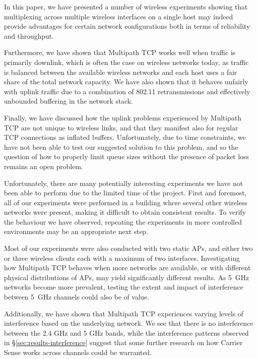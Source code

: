 In this paper, we have presented a number of wireless experiments showing that
multiplexing across multiple wireless interfaces on a single host may indeed
provide advantages for certain network configurations both in terms of
reliability and throughput.

Furthermore, we have shown that Multipath TCP works well when traffic is
primarily downlink, which is often the case on wireless networks today, as
traffic is balanced between the available wireless networks and each host uses a
fair share of the total network capacity. We have also shown that it behaves
unfairly with uplink traffic due to a combination of 802.11 retransmissions and
effectively unbounded buffering in the network stack.

Finally, we have discussed how the uplink problems experienced by Multipath TCP
are not unique to wireless links, and that they manifest also for regular TCP
connections as inflated buffers. Unfortunately, due to time constraints, we have
not been able to test our suggested solution to this problem, and so the
question of how to properly limit queue sizes without the presence of packet
loss remains an open problem.

Unfortunately, there are many potentially interesting experiments we have not
been able to perform due to the limited time of the project. First and foremost,
all of our experiments were performed in a building where several other wireless
networks were present, making it difficult to obtain consistent results. To
verify the behaviour we have observed, repeating the experiments in more
controlled environments may be an appropriate next step.

Most of our experiments were also conducted with two static APs, and either two
or three wireless clients each with a maximum of two interfaces. Investigating
how Multipath TCP behaves when more networks are available, or with different
physical distributions of APs, may yield significantly different results. As
5~GHz networks become more prevalent, testing the extent and impact of
interference between 5~GHz channels could also be of value. 

Additionally, we have shown that Multipath TCP experiences varying levels of
interference based on the underlying network. We see that there is no
interference between the 2.4 GHz and 5 GHz bands, while the interference
patterns observed in \S\ref{sec:results-interference} suggest that some further
research on how Carrier Sense works across channels could be warranted.

